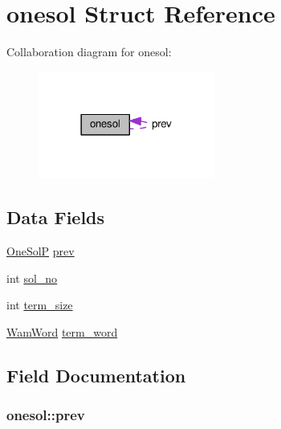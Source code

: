 \hypertarget{structonesol}{}\section{onesol Struct Reference}
\label{structonesol}


Collaboration diagram for onesol\+:\nopagebreak
\begin{figure}[H]
\begin{center}
\leavevmode
\includegraphics[width=165pt]{structonesol__coll__graph}
\end{center}
\end{figure}
\subsection*{Data Fields}
\begin{DoxyCompactItemize}
\item 
\hyperlink{all__solut__c_8c_a55aa7f8f8e643aa87a2980fb96d96df7}{One\+SolP} \hyperlink{structonesol_a67474d69d62f74ecb1da52cf3a6fd255}{prev}
\item 
int \hyperlink{structonesol_adf8141bfb4d67ec7ef0cdb66abc2e03d}{sol\+\_\+no}
\item 
int \hyperlink{structonesol_a7d00bc5747882c6030eff6839217f1d5}{term\+\_\+size}
\item 
\hyperlink{LINUX__SIGSEGV_8c_a10ea8be8823feb38875b8a9326cbb424}{Wam\+Word} \hyperlink{structonesol_ad2da50a130c4212644b22689ded445bf}{term\+\_\+word}
\end{DoxyCompactItemize}


\subsection{Field Documentation}
\subsubsection[{\texorpdfstring{prev}{prev}}]{ onesol\+::prev}\hypertarget{structonesol_a67474d69d62f74ecb1da52cf3a6fd255}{}\label{structonesol_a67474d69d62f74ecb1da52cf3a6fd255}
